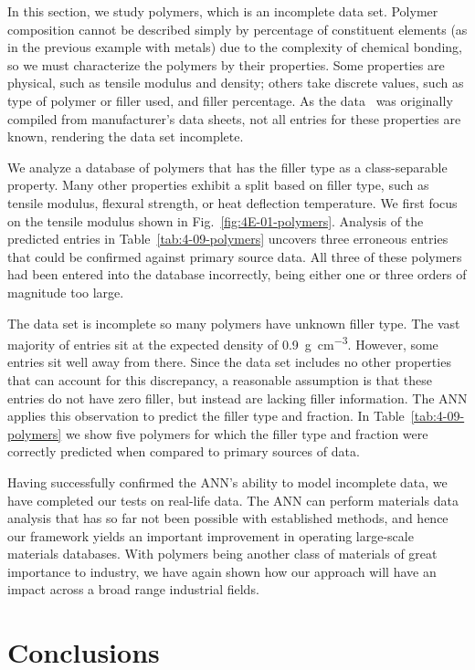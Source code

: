 \documentclass[review]{elsarticle}
\newcommand{\figref}[1]{Fig.~\ref{#1}}
\newcommand{\tabref}[1]{Table~\ref{#1}}
\begin{document}
In this section, we study polymers, which is an incomplete data set. Polymer
composition cannot be described simply by percentage of constituent elements
(as in the previous example with metals) due to the complexity of chemical
bonding, so we must characterize the polymers by their properties.  Some
properties are physical, such as tensile modulus and density; others take
discrete values, such as type of polymer or filler used, and filler
percentage. As the data~\cite{ProspectorPlastics} was originally compiled
from manufacturer's data sheets, not all entries for these properties are
known, rendering the data set incomplete.

We analyze a database of polymers that has the filler type as a
class-separable property. Many other properties exhibit a split based on
filler type, such as tensile modulus, flexural strength, or heat deflection
temperature. We first focus on the tensile modulus shown in
\figref{fig:4E-01-polymers}. Analysis of the predicted entries in
\tabref{tab:4-09-polymers} uncovers three erroneous entries that could be
confirmed against primary source data.  All three of these polymers had been
entered into the database incorrectly, being either one or three orders of
magnitude too large.

The data set is incomplete so many polymers have unknown filler type. The
vast majority of entries sit at the expected density of
\SI{0.9}{\gram\per\centi\meter\cubed}. However, some entries sit well away
from there. Since the data set includes no other properties that can account
for this discrepancy, a reasonable assumption is that these entries do not
have zero filler, but instead are lacking filler information. The ANN
applies this observation to predict the filler type and fraction. In
\tabref{tab:4-09-polymers} we show five polymers for which the filler type
and fraction were correctly predicted when compared to primary sources of
data.

Having successfully confirmed the ANN's ability to model incomplete data, we
have completed our tests on real-life data. The ANN can perform materials
data analysis that has so far not been possible with established methods,
and hence our framework yields an important improvement in operating
large-scale materials databases. With polymers being another class of
materials of great importance to industry, we have again shown how our
approach will have an impact across a broad range industrial fields.

\section{Conclusions}
\end{document}
